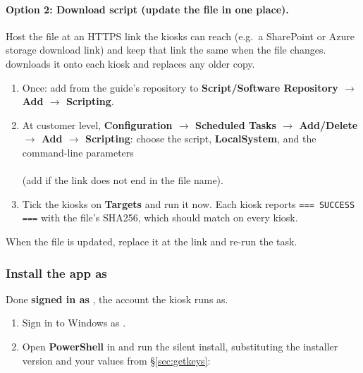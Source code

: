 \documentclass[a4paper,10pt]{article}
\begin{document}
\paragraph{Option 2: Download script (update the file in one place).}
Host the file at an HTTPS link the kiosks can reach (e.g.\ a SharePoint
or Azure storage download link) and keep that link the same when the
file changes.  downloads it onto each kiosk and
replaces any older copy.
\begin{enumerate}
  \item Once: add  from the guide's
        repository to \textbf{Script/Software Repository $\rightarrow$
        Add $\rightarrow$ Scripting}.
  \item At customer level, \textbf{Configuration $\rightarrow$ Scheduled
        Tasks $\rightarrow$ Add/Delete $\rightarrow$ Add $\rightarrow$
        Scripting}: choose the script, \textbf{LocalSystem}, and the
        command-line parameters\\
        \\
        (add  if the link does not end in the
        file name).
  \item Tick the kiosks on \textbf{Targets} and run it now. Each kiosk
        reports \texttt{=== SUCCESS ===} with the file's SHA256, which
        should match on every kiosk.
\end{enumerate}
When the file is updated, replace it at the link and re-run the task.

\subsubsection{Install the app as }\label{sec:silent}

Done \textbf{signed in as }, the account the kiosk
runs as.

\begin{enumerate}
  \item Sign in to Windows as .

  \item Open \textbf{PowerShell} in
        and run the silent install, substituting the installer version and
        your values from \S\ref{sec:getkeys}:
\end{enumerate}
\end{document}
